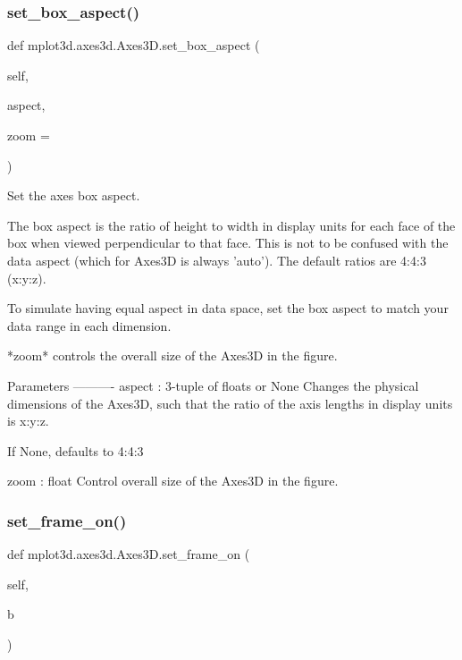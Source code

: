 \begin{DoxyVerb}
\subsubsection{\texorpdfstring{set\+\_\+box\+\_\+aspect()}{set\_box\_aspect()}}
{\footnotesize\ttfamily def mplot3d.\+axes3d.\+Axes3\+D.\+set\+\_\+box\+\_\+aspect (\begin{DoxyParamCaption}\item[{}]{self,  }\item[{}]{aspect,  }\item[{}]{zoom = {} }\end{DoxyParamCaption})}

\begin{DoxyVerb}Set the axes box aspect.

The box aspect is the ratio of height to width in display
units for each face of the box when viewed perpendicular to
that face.  This is not to be confused with the data aspect
(which for Axes3D is always 'auto').  The default ratios are
4:4:3 (x:y:z).

To simulate having equal aspect in data space, set the box
aspect to match your data range in each dimension.

*zoom* controls the overall size of the Axes3D in the figure.

Parameters
----------
aspect : 3-tuple of floats or None
    Changes the physical dimensions of the Axes3D, such that the ratio
    of the axis lengths in display units is x:y:z.

    If None, defaults to 4:4:3

zoom : float
    Control overall size of the Axes3D in the figure.
\end{DoxyVerb}
 \mbox{\label{classmplot3d_1_1axes3d_1_1Axes3D_a8fbdf85e4d3551aca38671550a17d4b1}} 
\subsubsection{\texorpdfstring{set\+\_\+frame\+\_\+on()}{set\_frame\_on()}}
{\footnotesize\ttfamily def mplot3d.\+axes3d.\+Axes3\+D.\+set\+\_\+frame\+\_\+on (\begin{DoxyParamCaption}\item[{}]{self,  }\item[{}]{b }\end{DoxyParamCaption})}


\end{DoxyVerb}
